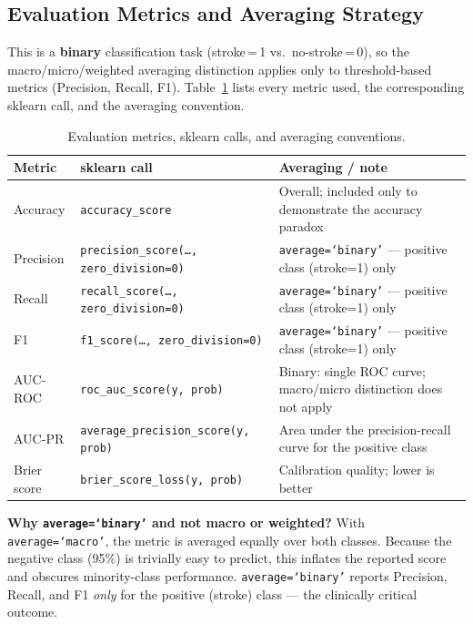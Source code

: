 \documentclass[11pt,a4paper]{article}
\begin{document}
\subsection{Evaluation Metrics and Averaging Strategy}

This is a \textbf{binary} classification task (stroke\,=\,1 vs.\ no-stroke\,=\,0), so the macro/micro/weighted averaging distinction applies only to threshold-based metrics (Precision, Recall, F1). Table~\ref{tab:metrics_def} lists every metric used, the corresponding sklearn call, and the averaging convention.

\begin{table}[H]
  \centering
  \caption{Evaluation metrics, sklearn calls, and averaging conventions.}
  \label{tab:metrics_def}
  \renewcommand{\arraystretch}{1.15}
  \begin{tabular}{lp{5.2cm}p{4.8cm}}
    \toprule
    \textbf{Metric} & \textbf{sklearn call} & \textbf{Averaging / note} \\
    \midrule
    Accuracy   & \texttt{accuracy\_score} & Overall; included only to demonstrate the accuracy paradox \\
    Precision  & \texttt{precision\_score(…, zero\_division=0)} & \texttt{average=`binary'} — positive class (stroke=1) only \\
    Recall     & \texttt{recall\_score(…, zero\_division=0)}    & \texttt{average=`binary'} — positive class (stroke=1) only \\
    F1         & \texttt{f1\_score(…, zero\_division=0)}         & \texttt{average=`binary'} — positive class (stroke=1) only \\
    AUC-ROC    & \texttt{roc\_auc\_score(y, prob)}               & Binary: single ROC curve; macro/micro distinction does not apply \\
    AUC-PR     & \texttt{average\_precision\_score(y, prob)}     & Area under the precision-recall curve for the positive class \\
    Brier score & \texttt{brier\_score\_loss(y, prob)}           & Calibration quality; lower is better \\
    \bottomrule
  \end{tabular}
\end{table}

\noindent\textbf{Why \texttt{average=`binary'} and not macro or weighted?}
With \texttt{average=`macro'}, the metric is averaged equally over both classes.
Because the negative class (95\%) is trivially easy to predict, this inflates the reported score and obscures minority-class performance.
\texttt{average=`binary'} reports Precision, Recall, and F1 \emph{only} for the positive (stroke) class — the clinically critical outcome.
\end{document}
